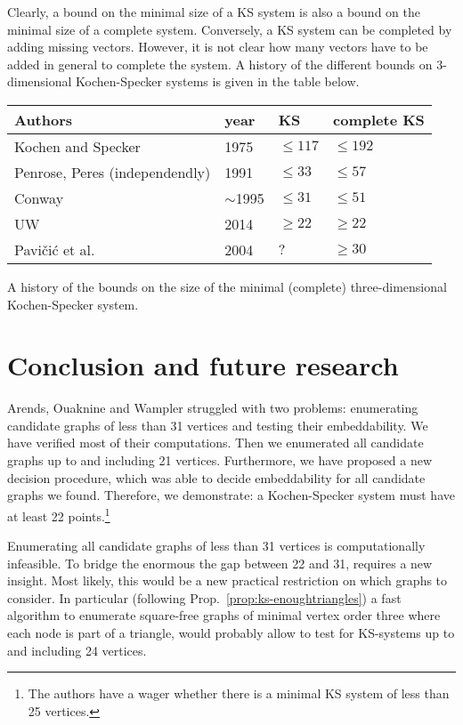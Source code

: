 \documentclass{report}
\begin{document}
Clearly, a bound on the minimal size of a KS system
is also a bound on the minimal size of a complete system.
Conversely, a KS system can be completed by adding missing vectors.
However, it is not clear how many vectors have to be added in general
to complete the system.
A history of the different bounds on 3-dimensional Kochen-Specker
systems is given in the table below.
\begin{center}
    \begin{tabular}{llll}
        Authors & year & KS & complete KS \\ \hline
        Kochen and Specker\cite{ks} & 1975 & $\leq 117$ & $\leq 192$ \\
        Penrose, Peres\cite{peres}
                (independendly)& 1991 & $\leq 33$ & $\leq 57$ \\
        Conway & $\sim$1995 & $\leq 31$ & $\leq 51$ \\
        UW\cite{UW14} & 2014 & $\geq 22$ & $\geq 22$ \\
        Pavi\v{c}i\'c et al.\cite{pavivcic}& 2004 & $?$ & $\geq 30$ \\
    \end{tabular}
\caption{A history of the bounds on the size of the minimal
    (complete) three-dimensional Kochen-Specker system.}
\end{center}


\section{Conclusion and future research}
Arends, Ouaknine and Wampler struggled with two problems:
enumerating candidate graphs of less than 31 vertices
and testing their embeddability.
We have verified most of their computations.
Then we enumerated all candidate graphs
up to and including 21 vertices.
Furthermore, we have proposed a new decision procedure,
which was able to decide embeddability
for all candidate graphs we found.
Therefore, we demonstrate: a Kochen-Specker system must have at least
22 points.\footnote{%
The authors have a wager whether there is a minimal KS system of less
than 25 vertices.}

Enumerating all candidate graphs of less than 31 vertices
is computationally infeasible.
To bridge the enormous the gap between 22 and 31,
requires a new insight.
Most likely, this would be a new
practical restriction on which graphs to consider.
In particular
(following Prop.~\ref{prop:ks-enoughtriangles})
a fast algorithm to enumerate
square-free graphs of minimal vertex order three
where each node is part of a triangle,
would probably allow to test for KS-systems
up to and including 24 vertices.
\end{document}
